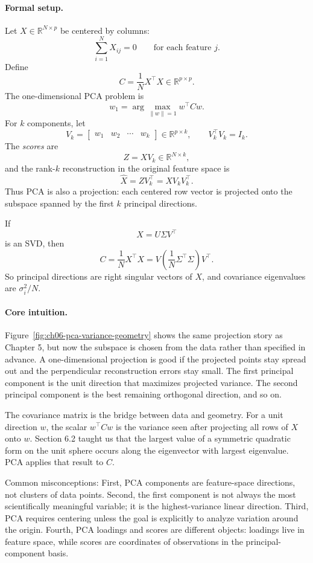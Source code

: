 \paragraph{Formal setup.}
Let \(X\in\mathbb{R}^{N\times p}\) be centered by columns:
\[
\sum_{i=1}^N X_{ij}=0
\qquad
\text{for each feature }j.
\]
Define
\[
C=\frac{1}{N}X^\top X\in\mathbb{R}^{p\times p}.
\]
The one-dimensional PCA problem is
\[
w_1=\arg\max_{\|w\|=1} w^\top Cw.
\]
For \(k\) components, let
\[
V_k=
\begin{bmatrix}
w_1&w_2&\cdots&w_k
\end{bmatrix}
\in\mathbb{R}^{p\times k},
\qquad
V_k^\top V_k=I_k.
\]
The \emph{scores} are
\[
Z=XV_k\in\mathbb{R}^{N\times k},
\]
and the rank-\(k\) reconstruction in the original feature space is
\[
\widehat X=ZV_k^\top=XV_kV_k^\top.
\]
Thus PCA is also a projection: each centered row vector is projected onto the subspace spanned by the first \(k\) principal directions.

If
\[
X=U\Sigma V^\top
\]
is an SVD, then
\[
C=\frac{1}{N}X^\top X
=V\left(\frac{1}{N}\Sigma^\top\Sigma\right)V^\top.
\]
So principal directions are right singular vectors of \(X\), and covariance eigenvalues are \(\sigma_i^2/N\).

\paragraph{Core intuition.}
Figure~\ref{fig:ch06-pca-variance-geometry} shows the same projection story as Chapter 5, but now the subspace is chosen from the data rather than specified in advance. A one-dimensional projection is good if the projected points stay spread out and the perpendicular reconstruction errors stay small. The first principal component is the unit direction that maximizes projected variance. The second principal component is the best remaining orthogonal direction, and so on.

The covariance matrix is the bridge between data and geometry. For a unit direction \(w\), the scalar \(w^\top Cw\) is the variance seen after projecting all rows of \(X\) onto \(w\). Section 6.2 taught us that the largest value of a symmetric quadratic form on the unit sphere occurs along the eigenvector with largest eigenvalue. PCA applies that result to \(C\).

Common misconceptions: First, PCA components are feature-space directions, not clusters of data points. Second, the first component is not always the most scientifically meaningful variable; it is the highest-variance linear direction. Third, PCA requires centering unless the goal is explicitly to analyze variation around the origin. Fourth, PCA loadings and scores are different objects: loadings live in feature space, while scores are coordinates of observations in the principal-component basis.

